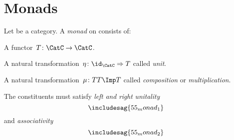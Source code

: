 
\section{Monads}

\begin{ctdefinition}[Monad]
    Let \CatC be a category. A \emph{monad} on \CatC consists of:
    \begin{compactenum}
        \item A functor~$T \colon \CatC \to \CatC$.
        \item A natural transformation~$\eta \colon \id_\CatC \Rightarrow T$ called \emph{unit}.
        \item A natural transformation~$\mu\colon TT\Imp T$ called \emph{composition} or \emph{multiplication}.
    \end{compactenum}
    The constituents must satisfy \emph{left and right unitality}
    \begin{equation}
        \includesag{55_monad_1}
    \end{equation}
    and \emph{associativity}
    \begin{equation}
        \includesag{55_monad_2}
    \end{equation}
\end{ctdefinition}
